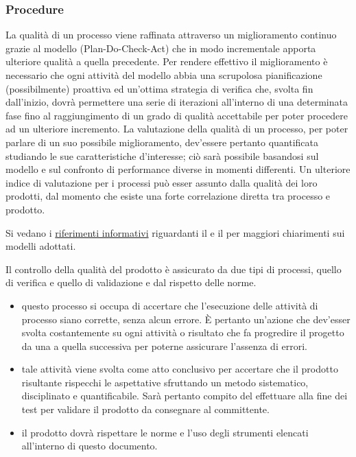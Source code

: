 \documentclass[a4paper, titlepage]{article}
\begin{document}
\subsubsection{Procedure}

La qualità di un processo viene raffinata attraverso un miglioramento continuo grazie al modello  (Plan-Do-Check-Act) che in modo incrementale apporta ulteriore qualità a quella precedente. Per rendere effettivo il miglioramento è necessario che ogni attività del modello abbia una scrupolosa pianificazione (possibilmente) proattiva ed un'ottima strategia di verifica che, svolta fin dall'inizio, dovrà permettere una serie di iterazioni all'interno di una determinata fase fino al raggiungimento di un grado di qualità accettabile per poter procedere ad un ulteriore incremento.
\newline La valutazione della qualità di un processo, per poter parlare di un suo possibile miglioramento, dev'essere pertanto quantificata studiando le sue caratteristiche d'interesse; ciò sarà possibile basandosi sul modello  e sul confronto di performance diverse in momenti differenti.
\newline Un ulteriore indice di valutazione per i processi può esser assunto dalla qualità dei loro prodotti, dal momento che esiste una forte correlazione diretta tra processo e prodotto.

Si vedano i \hyperref[rifinfo]{riferimenti informativi} riguardanti il  e il  per maggiori chiarimenti sui modelli adottati.

Il controllo della qualità del prodotto è assicurato da due tipi di processi, quello di verifica e quello di validazione e dal rispetto delle norme.
\begin{itemize}
	\item {} questo processo si occupa di accertare che l'esecuzione delle attività di processo siano corrette, senza alcun errore. È pertanto un'azione che dev'esser svolta costantemente su ogni attività o risultato che fa progredire il progetto da una  a quella successiva per poterne assicurare l'assenza di errori.
	\\
	\item {} tale attività viene svolta come atto conclusivo per accertare che il prodotto risultante rispecchi le aspettative sfruttando un metodo sistematico, disciplinato e quantificabile. Sarà pertanto compito del  effettuare alla fine dei test per validare il prodotto da consegnare al committente.
	\\
	\item {} il prodotto dovrà rispettare le norme e l'uso degli strumenti elencati all'interno di questo documento.
\end{itemize}
\end{document}

